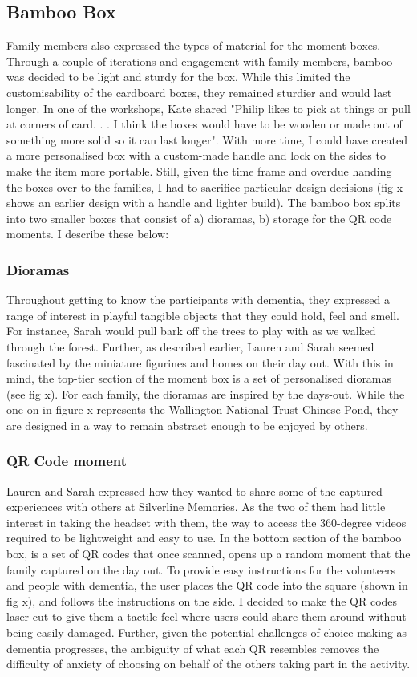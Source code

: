 \subsection{Bamboo Box}
\label{Bamboo box}
Family members also expressed the types of material for the moment boxes. Through a couple of iterations and engagement with family members, bamboo was decided to be light and sturdy for the box. While this limited the customisability of the cardboard boxes, they remained sturdier and would last longer. In one of the workshops, Kate shared "Philip likes to pick at things or pull at corners of card. . . I think the boxes would have to be wooden or made out of something more solid so it can last longer". With more time, I could have created a more personalised box with a custom-made handle and lock on the sides to make the item more portable. Still, given the time frame and overdue handing the boxes over to the families, I had to sacrifice particular design decisions (fig x shows an earlier design with a handle and lighter build). The bamboo box splits into two smaller boxes that consist of a) dioramas, b) storage for the QR code moments. I describe these below:

\subsubsection{Dioramas}
\label{Dioramas}
Throughout getting to know the participants with dementia, they expressed a range of interest in playful tangible objects that they could hold, feel and smell. For instance, Sarah would pull bark off the trees to play with as we walked through the forest. Further, as described earlier, Lauren and Sarah seemed fascinated by the miniature figurines and homes on their day out. With this in mind, the top-tier section of the moment box is a set of personalised dioramas (see fig x). For each family, the dioramas are inspired by the days-out. While the one on in figure x represents the Wallington National Trust Chinese Pond, they are designed in a way to remain abstract enough to be enjoyed by others. 

\subsubsection{QR Code moment}
\label{QR-Code-Moments}
Lauren and Sarah expressed how they wanted to share some of the captured experiences with others at Silverline Memories. As the two of them had little interest in taking the headset with them, the way to access the 360-degree videos required to be lightweight and easy to use. In the bottom section of the bamboo box, is a set of QR codes that once scanned, opens up a random moment that the family captured on the day out. To provide easy instructions for the volunteers and people with dementia, the user places the QR code into the square (shown in fig x), and follows the instructions on the side. I decided to make the QR codes laser cut to give them a tactile feel where users could share them around without being easily damaged. Further, given the potential challenges of choice-making as dementia progresses, the ambiguity of what each QR resembles removes the difficulty of anxiety of choosing on behalf of the others taking part in the activity.


